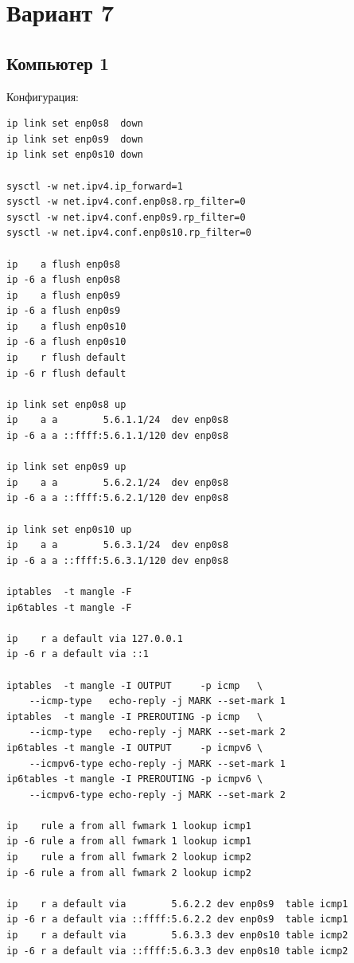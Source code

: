 \section{Вариант 7}

\subsection{Компьютер 1}
Конфигурация:
\begin{verbatim}
ip link set enp0s8  down
ip link set enp0s9  down
ip link set enp0s10 down

sysctl -w net.ipv4.ip_forward=1
sysctl -w net.ipv4.conf.enp0s8.rp_filter=0
sysctl -w net.ipv4.conf.enp0s9.rp_filter=0
sysctl -w net.ipv4.conf.enp0s10.rp_filter=0

ip    a flush enp0s8
ip -6 a flush enp0s8
ip    a flush enp0s9
ip -6 a flush enp0s9
ip    a flush enp0s10
ip -6 a flush enp0s10
ip    r flush default
ip -6 r flush default

ip link set enp0s8 up
ip    a a        5.6.1.1/24  dev enp0s8
ip -6 a a ::ffff:5.6.1.1/120 dev enp0s8

ip link set enp0s9 up
ip    a a        5.6.2.1/24  dev enp0s8
ip -6 a a ::ffff:5.6.2.1/120 dev enp0s8

ip link set enp0s10 up
ip    a a        5.6.3.1/24  dev enp0s8
ip -6 a a ::ffff:5.6.3.1/120 dev enp0s8

iptables  -t mangle -F
ip6tables -t mangle -F

ip    r a default via 127.0.0.1
ip -6 r a default via ::1

iptables  -t mangle -I OUTPUT     -p icmp   \
    --icmp-type   echo-reply -j MARK --set-mark 1
iptables  -t mangle -I PREROUTING -p icmp   \
    --icmp-type   echo-reply -j MARK --set-mark 2
ip6tables -t mangle -I OUTPUT     -p icmpv6 \
    --icmpv6-type echo-reply -j MARK --set-mark 1
ip6tables -t mangle -I PREROUTING -p icmpv6 \
    --icmpv6-type echo-reply -j MARK --set-mark 2

ip    rule a from all fwmark 1 lookup icmp1
ip -6 rule a from all fwmark 1 lookup icmp1
ip    rule a from all fwmark 2 lookup icmp2
ip -6 rule a from all fwmark 2 lookup icmp2

ip    r a default via        5.6.2.2 dev enp0s9  table icmp1
ip -6 r a default via ::ffff:5.6.2.2 dev enp0s9  table icmp1
ip    r a default via        5.6.3.3 dev enp0s10 table icmp2
ip -6 r a default via ::ffff:5.6.3.3 dev enp0s10 table icmp2
\end{verbatim}

